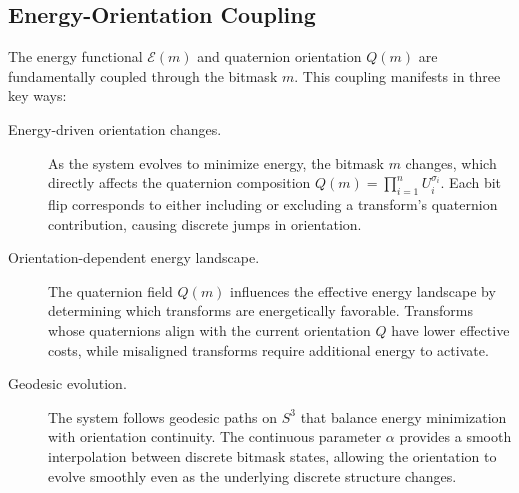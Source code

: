\documentclass{article}
\begin{document}
\subsection{Energy-Orientation Coupling}
The energy functional $\mathcal{E}(m)$ and quaternion orientation $Q(m)$ are fundamentally coupled through the bitmask $m$. This coupling manifests in three key ways:

\begin{description}
  \item[Energy-driven orientation changes.] As the system evolves to minimize energy, the bitmask $m$ changes, which directly affects the quaternion composition $Q(m) = \prod_{i=1}^n U_i^{\sigma_i}$. Each bit flip corresponds to either including or excluding a transform's quaternion contribution, causing discrete jumps in orientation.
  
  \item[Orientation-dependent energy landscape.] The quaternion field $Q(m)$ influences the effective energy landscape by determining which transforms are energetically favorable. Transforms whose quaternions align with the current orientation $Q$ have lower effective costs, while misaligned transforms require additional energy to activate.
  
  \item[Geodesic evolution.] The system follows geodesic paths on $S^3$ that balance energy minimization with orientation continuity. The continuous parameter $\alpha$ provides a smooth interpolation between discrete bitmask states, allowing the orientation to evolve smoothly even as the underlying discrete structure changes.
\end{description}
\end{document}
